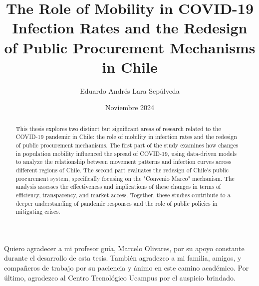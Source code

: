 \documentclass[upright, contnum]{umemoria}
\author{Eduardo Andrés Lara Sepúlveda}
\title{The Role of Mobility in COVID-19 Infection Rates and the Redesign of Public Procurement Mechanisms in Chile}
\date{Noviembre 2024}
\begin{document}
\frontmatter
\maketitle

\begin{abstract}
{This thesis explores two distinct but significant areas of research 
related to the COVID-19 pandemic in Chile: the role of mobility in 
infection rates and the redesign of public procurement mechanisms. 
The first part of the study examines how changes in population mobility 
influenced the spread of COVID-19, using data-driven models to analyze 
the relationship between movement patterns and infection curves across 
different regions of Chile. The second part evaluates the redesign of 
Chile's public procurement system, specifically focusing on the 
"Convenio Marco" mechanism. The analysis assesses the effectiveness 
and implications of these changes in terms of efficiency, transparency, 
and market access. Together, these studies contribute to a deeper 
understanding of pandemic responses and the role of public policies 
in mitigating crises.}
\end{abstract}

\begin{dedicatoria} %
\end{dedicatoria}

\begin{thanks} %
    \cambiarlinea{} Quiero agradecer a mi profesor guía, Marcelo Olivares, por su apoyo constante 
    durante el desarrollo de esta tesis. También agradezco a mi familia, amigos, 
    y compañeros de trabajo por su paciencia y ánimo en este camino académico. 
    Por último, agradezco al Centro Tecnológico Ucampus por el auspicio brindado.
    \end{thanks}
    
\cleardoublepage %

\tableofcontents
\listoftables %
\listoffigures %

\mainmatter %

% 

% 
% 



% 
% 

\end{document}
